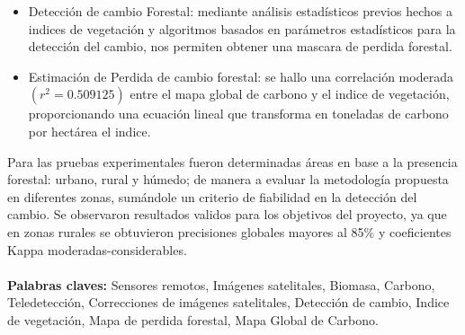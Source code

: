 \documentclass[11pt, a4paper, oneside]{Thesis} %
\begin{document}
{\begin{itemize}
	\item Detecci\'on de cambio Forestal: mediante an\'alisis estad\'isticos previos hechos a indices de vegetaci\'on y algoritmos basados en par\'ametros estad\'isticos para la detecci\'on del cambio, nos permiten obtener una mascara de perdida forestal.
	\item Estimaci\'on de Perdida de cambio forestal: se hallo una correlaci\'on moderada $ (r^{2}=0.509125) $ entre el mapa global de carbono y el indice de vegetaci\'on, proporcionando una ecuaci\'on lineal que transforma en toneladas de carbono por hect\'area el indice.
\end{itemize}
 Para las pruebas experimentales fueron determinadas \'areas en base a la presencia forestal: urbano, rural y h\'umedo; de manera a evaluar la metodolog\'ia propuesta en diferentes zonas, sum\'andole un criterio de fiabilidad en la detecci\'on del cambio. Se observaron resultados validos para los objetivos del proyecto, ya que en zonas rurales se obtuvieron precisiones globales mayores al 85\% y coeficientes Kappa moderadas-considerables.\\~\\
\textbf{ Palabras claves: }Sensores remotos, Im\'agenes satelitales, Biomasa, Carbono, Teledetecci\'on, Correcciones de im\'agenes satelitales, Detecci\'on de cambio, Indice de vegetaci\'on, Mapa de perdida forestal, Mapa Global de Carbono. 
 




\clearpage %
}
\end{document}

